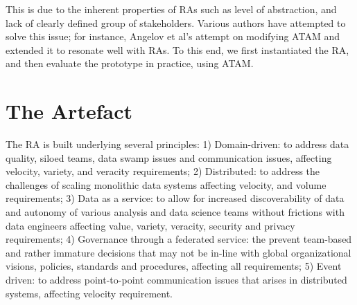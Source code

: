\documentclass[conference]{IEEEtran}
\begin{document}
\begin{LaTeXdescription}
This is due to the inherent properties of RAs such as level of abstraction, and lack of clearly defined group of stakeholders. Various authors have attempted to solve this issue; for instance, Angelov et al's \cite{angelov2008towards} attempt on modifying ATAM and extended it to resonate well with RAs. To this end, we first instantiated the RA, and then evaluate the prototype in practice, using ATAM. 




\end{LaTeXdescription}


\section{The Artefact}




The RA is built underlying several principles: 1) Domain-driven: to address data quality, siloed teams, data swamp issues and communication issues, affecting velocity, variety, and veracity requirements; 2) Distributed: to address the challenges of scaling monolithic data systems affecting velocity, and volume requirements; 3) Data as a service: to allow for increased discoverability of data and autonomy of various analysis and data science teams without frictions with data engineers affecting value, variety, veracity, security and privacy requirements; 4) Governance through a federated service: the prevent team-based and rather immature decisions that may not be in-line with global organizational visions, policies, standards and procedures, affecting all requirements; 5) Event driven: to address point-to-point communication issues that arises in distributed systems, affecting velocity requirement. 
\end{document}
